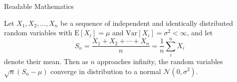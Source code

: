\documentclass{beamer}
\begin{document}
\begin{frame}{Readable Mathematics}

Let $X_1, X_2, \ldots, X_n$ be a sequence of independent and identically distributed random variables with $\text{E}[X_i] = \mu$ and $\text{Var}[X_i] = \sigma^2 < \infty$, and let
\[ S_n = \frac{X_1 + X_2 + \cdots + X_n}{n}
      = \frac{1}{n}\sum_{i}^{n} X_i \]
denote their mean. Then as $n$ approaches infinity, the random variables $\sqrt{n}(S_n - \mu)$ converge in distribution to a normal $\mathcal{N}(0, \sigma^2)$.

\end{frame}
\end{document}
